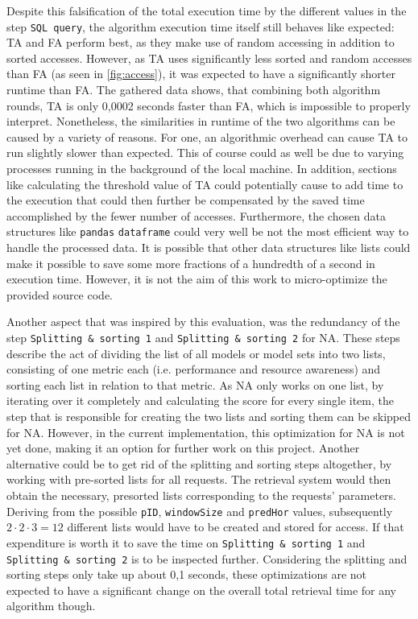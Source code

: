 Despite this falsification of the total execution time by the different values in the step \texttt{SQL query}, the algorithm execution time itself still behaves like expected: TA and FA perform best, as they make use of random accessing in addition to sorted accesses. However, as TA uses significantly less sorted and random accesses than FA (as seen in \autoref{fig:access}), it was expected to have a significantly shorter runtime than FA. The gathered data shows, that combining both algorithm rounds, TA is only 0,0002 seconds faster than FA, which is impossible to properly interpret. Nonetheless, the similarities in runtime of the two algorithms can be caused by a variety of reasons. For one, an algorithmic overhead can cause TA to run slightly slower than expected. This of course could as well be due to varying processes running in the background of the local machine. In addition, sections like calculating the threshold value of TA could potentially cause to add time to the execution that could then further be compensated by the saved time accomplished by the fewer number of accesses. Furthermore, the chosen data structures like \texttt{pandas} \texttt{dataframe} could very well be not the most efficient way to handle the processed data. It is possible that other data structures like lists could make it possible to save some more fractions of a hundredth of a second in execution time. However, it is not the aim of this work to micro-optimize the provided source code. 

Another aspect that was inspired by this evaluation, was the redundancy of the step \texttt{Splitting \& sorting 1} and \texttt{Splitting \& sorting 2} for NA. These steps describe the act of dividing the list of all models or model sets into two lists, consisting of one metric each (i.e. performance and resource awareness) and sorting each list in relation to that metric. As NA only works on one list, by iterating over it completely and calculating the score for every single item, the step that is responsible for creating the two lists and sorting them can be skipped for NA. However, in the current implementation, this optimization for NA is not yet done, making it an option for further work on this project. Another alternative could be to get rid of the splitting and sorting steps altogether, by working with pre-sorted lists for all requests. The retrieval system would then obtain the necessary, presorted lists corresponding to the requests' parameters. Deriving from the possible \texttt{pID}, \texttt{windowSize} and \texttt{predHor} values, subsequently $2 \cdot 2 \cdot 3 = 12$ different lists would have to be created and stored for access. If that expenditure is worth it to save the time on \texttt{Splitting \& sorting 1} and \texttt{Splitting \& sorting 2} is to be inspected further. Considering the splitting and sorting steps only take up about 0,1 seconds, these optimizations are not expected to have a significant change on the overall total retrieval time for any algorithm though. 

